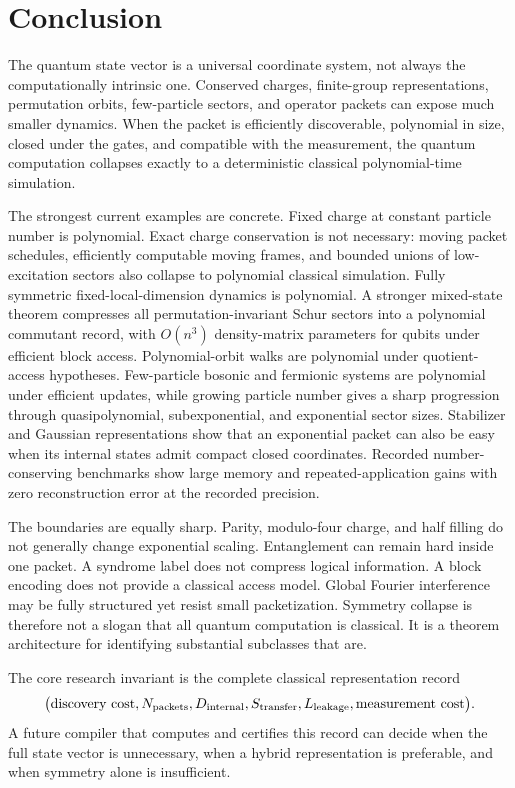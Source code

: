 \chapter{Conclusion}
The quantum state vector is a universal coordinate system, not always the computationally intrinsic one. Conserved charges, finite-group representations, permutation orbits, few-particle sectors, and operator packets can expose much smaller dynamics. When the packet is efficiently discoverable, polynomial in size, closed under the gates, and compatible with the measurement, the quantum computation collapses exactly to a deterministic classical polynomial-time simulation.

The strongest current examples are concrete. Fixed charge at constant particle number is polynomial. Exact charge conservation is not necessary: moving packet schedules, efficiently computable moving frames, and bounded unions of low-excitation sectors also collapse to polynomial classical simulation. Fully symmetric fixed-local-dimension dynamics is polynomial. A stronger mixed-state theorem compresses all permutation-invariant Schur sectors into a polynomial commutant record, with $O(n^3)$ density-matrix parameters for qubits under efficient block access. Polynomial-orbit walks are polynomial under quotient-access hypotheses. Few-particle bosonic and fermionic systems are polynomial under efficient updates, while growing particle number gives a sharp progression through quasipolynomial, subexponential, and exponential sector sizes. Stabilizer and Gaussian representations show that an exponential packet can also be easy when its internal states admit compact closed coordinates. Recorded number-conserving benchmarks show large memory and repeated-application gains with zero reconstruction error at the recorded precision.

The boundaries are equally sharp. Parity, modulo-four charge, and half filling do not generally change exponential scaling. Entanglement can remain hard inside one packet. A syndrome label does not compress logical information. A block encoding does not provide a classical access model. Global Fourier interference may be fully structured yet resist small packetization. Symmetry collapse is therefore not a slogan that all quantum computation is classical. It is a theorem architecture for identifying substantial subclasses that are.

The core research invariant is the complete classical representation record
\[
\bigl(
\text{discovery cost},
N_{\rm packets},
D_{\rm internal},
S_{\rm transfer},
L_{\rm leakage},
\text{measurement cost}
\bigr).
\]
A future compiler that computes and certifies this record can decide when the full state vector is unnecessary, when a hybrid representation is preferable, and when symmetry alone is insufficient.
